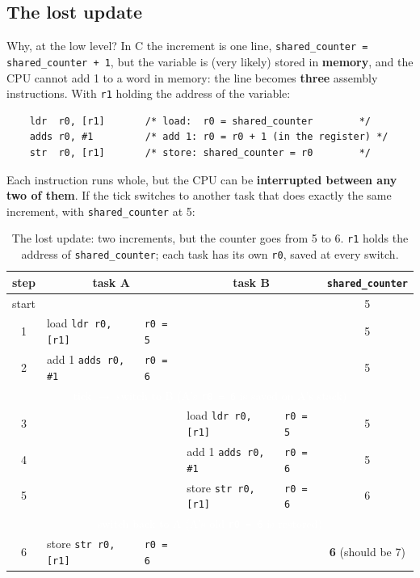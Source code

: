 \subsection{The lost update}
Why, at the low level? In C the increment is one line, \texttt{shared\_counter = shared\_counter + 1}, but the variable is (very likely) stored in \textbf{memory}, and the CPU cannot add 1 to a word in memory: the line becomes \textbf{three} assembly instructions. With \texttt{r1} holding the address of the variable:
\begin{lstlisting}
    ldr  r0, [r1]       /* load:  r0 = shared_counter        */
    adds r0, #1         /* add 1: r0 = r0 + 1 (in the register) */
    str  r0, [r1]       /* store: shared_counter = r0        */
\end{lstlisting}
Each instruction runs whole, but the CPU can be \textbf{interrupted between any two of them}. If the tick switches to another task that does exactly the same increment, with \texttt{shared\_counter} at 5:

\begin{table}[H]
\centering
\small
\begin{tabular}{c | l l | l l | c}
    \hline
    \textbf{step} & \multicolumn{2}{c|}{\textbf{task A}} & \multicolumn{2}{c|}{\textbf{task B}} & \texttt{shared\_counter} \\
    \hline
    start & & & & & 5 \\
    1 & load \texttt{ldr r0, [r1]} & \texttt{r0 = 5} & & & 5 \\
    2 & add 1 \texttt{adds r0, \#1} & \texttt{r0 = 6} & & & 5 \\
    \hline
    \multicolumn{6}{c}{\cellcolor{black}\textcolor{white}{\footnotesize tick $\to$ switch to B (A's \texttt{r0 = 6} is saved on A's stack)}} \\
    \hline
    3 & & & load \texttt{ldr r0, [r1]} & \texttt{r0 = 5} & 5 \\
    4 & & & add 1 \texttt{adds r0, \#1} & \texttt{r0 = 6} & 5 \\
    5 & & & store \texttt{str r0, [r1]} & \texttt{r0 = 6} & 6 \\
    \hline
    \multicolumn{6}{c}{\cellcolor{black}\textcolor{white}{\footnotesize switch back to A (A's old \texttt{r0 = 6} is restored)}} \\
    \hline
    6 & store \texttt{str r0, [r1]} & \texttt{r0 = 6} & & & \cellcolor{red!15}\textbf{6} (should be 7) \\
    \hline
\end{tabular}
\caption{The lost update: two increments, but the counter goes from 5 to 6. \texttt{r1} holds the address of \texttt{shared\_counter}; each task has its own \texttt{r0}, saved at every switch.}
\end{table}

